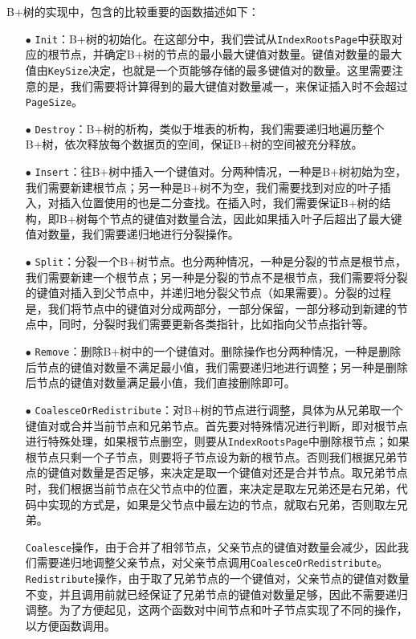 \documentclass[12pt]{article}
\begin{document}
    B+树的实现中，包含的比较重要的函数描述如下：
    \begin{itemize}
        \item[$\bullet$] \texttt{Init}：B+树的初始化。在这部分中，我们尝试从\texttt{IndexRootsPage}中获取对应的根节点，并确定B+树的节点的最小最大键值对数量。键值对数量的最大值由\texttt{KeySize}决定，也就是一个页能够存储的最多键值对的数量。这里需要注意的是，我们需要将计算得到的最大键值对数量减一，来保证插入时不会超过\texttt{PageSize}。
        \item[$\bullet$] \texttt{Destroy}：B+树的析构，类似于堆表的析构，我们需要递归地遍历整个B+树，依次释放每个数据页的空间，保证B+树的空间被充分释放。
        \item[$\bullet$] \texttt{Insert}：往B+树中插入一个键值对。分两种情况，一种是B+树初始为空，我们需要新建根节点；另一种是B+树不为空，我们需要找到对应的叶子插入，对插入位置使用的也是二分查找。在插入时，我们需要保证B+树的结构，即B+树每个节点的键值对数量合法，因此如果插入叶子后超出了最大键值对数量，我们需要递归地进行分裂操作。
        \item[$\bullet$] \texttt{Split}：分裂一个B+树节点。也分两种情况，一种是分裂的节点是根节点，我们需要新建一个根节点；另一种是分裂的节点不是根节点，我们需要将分裂的键值对插入到父节点中，并递归地分裂父节点（如果需要）。分裂的过程是，我们将节点中的键值对分成两部分，一部分保留，一部分移动到新建的节点中，同时，分裂时我们需要更新各类指针，比如指向父节点指针等。
        \item[$\bullet$] \texttt{Remove}：删除B+树中的一个键值对。删除操作也分两种情况，一种是删除后节点的键值对数量不满足最小值，我们需要递归地进行调整；另一种是删除后节点的键值对数量满足最小值，我们直接删除即可。
        \item[$\bullet$] \texttt{CoalesceOrRedistribute}：对B+树的节点进行调整，具体为从兄弟取一个键值对或合并当前节点和兄弟节点。首先要对特殊情况进行判断，即对根节点进行特殊处理，如果根节点删空，则要从\texttt{IndexRootsPage}中删除根节点；如果根节点只剩一个子节点，则要将子节点设为新的根节点。否则我们根据兄弟节点的键值对数量是否足够，来决定是取一个键值对还是合并节点。取兄弟节点时，我们根据当前节点在父节点中的位置，来决定是取左兄弟还是右兄弟，代码中实现的方式是，如果是父节点中最左边的节点，就取右兄弟，否则取左兄弟。
        
        \texttt{Coalesce}操作，由于合并了相邻节点，父亲节点的键值对数量会减少，因此我们需要递归地调整父亲节点，对父亲节点调用\texttt{CoalesceOrRedistribute}。\texttt{Redistribute}操作，由于取了兄弟节点的一个键值对，父亲节点的键值对数量不变，并且调用前就已经保证了兄弟节点的键值对数量足够，因此不需要递归调整。为了方便起见，这两个函数对中间节点和叶子节点实现了不同的操作，以方便函数调用。
    \end{itemize}
\end{document}
